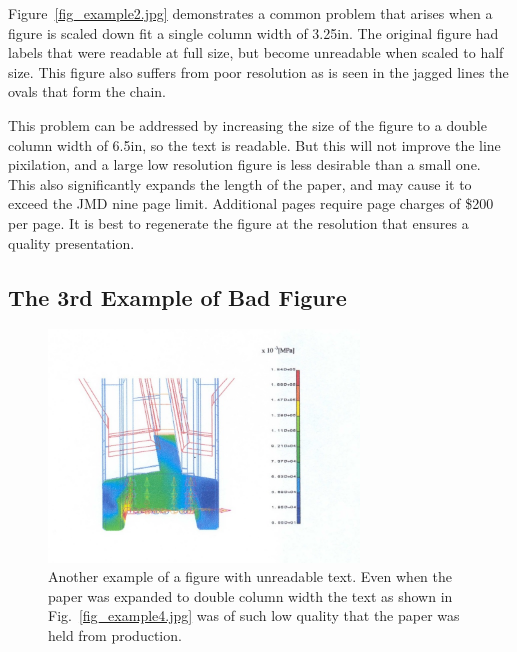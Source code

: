 \documentclass[twocolumn,10pt]{asme2ej}
\begin{document}
Figure~\ref{fig_example2.jpg}
demonstrates a common problem that arises when a figure is scaled down fit a single column width of 3.25in.  The original figure had labels that were readable at full size, but become unreadable when scaled to half size.  This figure also suffers from poor resolution as is seen in the jagged lines the ovals that form the chain.

This problem can be addressed by increasing the size of the figure to a double column width of 6.5in, so the text is readable.  But this will not improve the line pixilation, and a large low resolution figure is less desirable than a small one.  This also significantly expands the length of the paper, and may cause it to exceed the JMD nine page limit.  Additional pages require page charges of \$200 per page.  It is best to regenerate the figure at the resolution that ensures a quality presentation.


\subsection{The 3rd Example of Bad Figure}
\begin{figure} 
\centerline{\includegraphics[width=3.25in]{figure/FMANU_MD_04_1274_13.jpg}}
\caption{Another example of a figure with unreadable text.  Even when the paper was expanded to double column width the text as shown in Fig.~\ref{fig_example4.jpg} was of such low quality that the paper was held from production.}
\label{fig_example3.jpg}
\end{figure}
\end{document}
